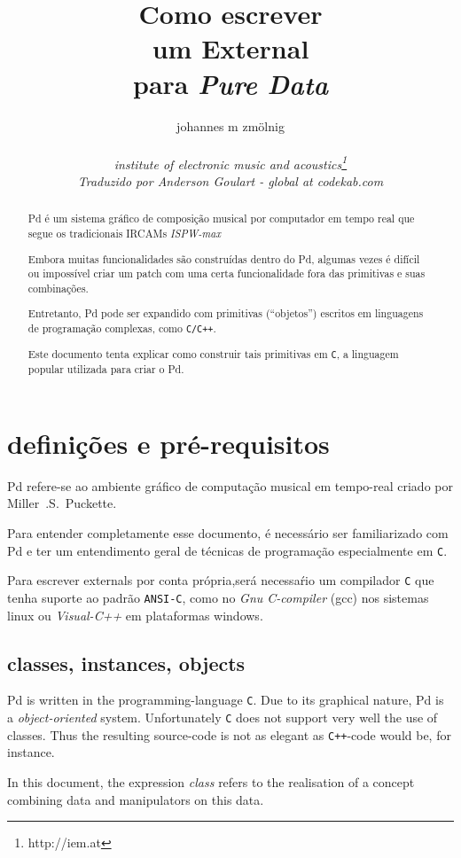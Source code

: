 \documentclass[12pt, a4paper,english,titlepage]{article}
\title{
Como escrever  \\
um External \\
para {\em Pure Data}
}
\author{
johannes m zmölnig \\
\\
{\em institute of electronic music and acoustics\footnote{http://iem.at}}
\\
{\em Traduzido por Anderson Goulart - global at codekab.com}
}
\date{}
\begin{document}
\maketitle

\begin{abstract}
Pd é um sistema gráfico de composição musical por computador em tempo real que segue
os tradicionais IRCAMs {\em ISPW-max}

Embora muitas funcionalidades são construídas dentro do Pd,
algumas vezes é difícil ou impossível criar um patch com uma certa funcionalidade
fora das primitivas e suas combinações.

Entretanto, Pd pode ser expandido com primitivas (``objetos'')
escritos em linguagens de programação complexas, como {\tt C/C++}. 

Este documento tenta explicar como construir tais primitivas em  {\tt C},
a linguagem popular utilizada para criar o Pd.
\end{abstract}


\vfill
\newpage

\tableofcontents

\vfill
\newpage

\section{definições e pré-requisitos}
Pd refere-se ao ambiente gráfico de computação musical em tempo-real criado por
Miller~.S.~Puckette.

Para entender completamente esse documento, é necessário ser
familiarizado com Pd e ter um entendimento geral de técnicas de  programação 
especialmente em {\tt C}.

Para escrever externals por conta própria,será necessaŕio um compilador {\tt C} que tenha 
suporte ao padrão {\tt ANSI-C},  como no {\em Gnu C-compiler} (gcc) nos sistemas
linux ou {\em Visual-C++} em plataformas windows.



\subsection{classes, instances, objects}
Pd is written in the programming-language {\tt C}.
Due to its graphical nature, Pd is a {\em object-oriented} system.
Unfortunately {\tt C} does not support very well the use of classes.
Thus the resulting source-code is not as elegant as {\tt C++}-code would be, for instance.

In this document, the expression {\em class} refers to the realisation of a concept
combining data and manipulators on this data.
\end{document}
